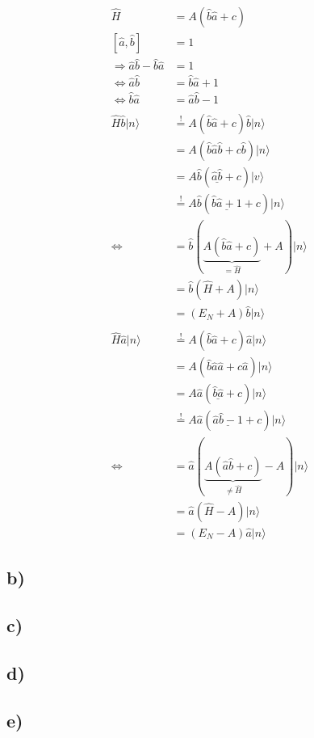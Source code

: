     \begin{align*}
        \hat{H} &= A\left( \hat{b}\hat{a} + c \right)\\
        \left[ \hat{a}, \hat{b} \right] &= 1\\
        \Rightarrow \hat{a}\hat{b} - \hat{b}\hat{a} &= 1\\
        \Leftrightarrow \hat{a}\hat{b} &= \hat{b}\hat{a} + 1\\
        \Leftrightarrow \hat{b}\hat{a} &= \hat{a}\hat{b} - 1\\
        \\
        \hat{H}\hat{b} \vert n \rangle &\stackrel{!}{=} A\left( \hat{b}\hat{a} +c \right)\hat{b} \vert n \rangle\\
        &= A\left(\hat{b}\hat{a}\hat{b}+c\hat{b} \right) \vert n \rangle\\
        &= A\hat{b} \left( \underline{\hat{a}\hat{b}} +c \right) \vert v \rangle\\
        &\stackrel{!}{=} A\hat{b} \left( \underline{\hat{b}\hat{a} + 1} + c \right) \vert n \rangle\\
        \Leftrightarrow &= \hat{b} \left(\underbrace{A\left(\hat{b}\hat{a}+c \right)}_{=\hat{H}} + A \right) \vert n \rangle\\
        &= \hat{b} \left( \hat{H} + A \right) \vert n \rangle\\
        &= \left( E_N + A \right) \hat{b} \vert n \rangle\\
        \\
        \hat{H}\hat{a} \vert n \rangle &\stackrel{!}{=} A\left( \hat{b}\hat{a} +c \right)\hat{a} \vert n \rangle\\ 
        &= A\left(\hat{b}\hat{a}\hat{a}+c\hat{a} \right) \vert n \rangle\\
        &= A\hat{a} \left( \underline{\hat{b}\hat{a}} +c \right) \vert n \rangle\\
        &\stackrel{!}{=} A\hat{a} \left( \underline{\hat{a}\hat{b} - 1} + c \right) \vert n \rangle\\
        \Leftrightarrow &= \hat{a} \left(\underbrace{A\left(\hat{a}\hat{b}+c \right)}_{\neq\hat{H}} - A \right) \vert n \rangle\\
        &= \hat{a} \left( \hat{H} - A \right) \vert n \rangle\\
        &= \left( E_N - A \right) \hat{a} \vert n \rangle
    \end{align*}

    \subsection{b)}

    \subsection{c)}

    \subsection{d)}

    \subsection{e)}

